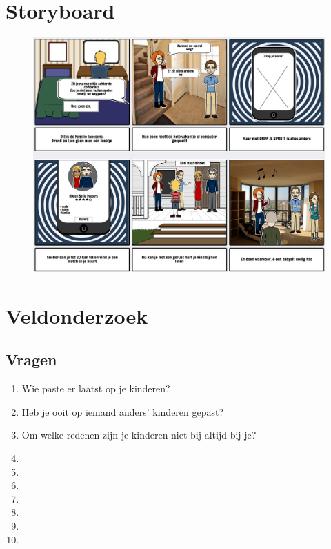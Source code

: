 \documentclass[a4paper,12pt]{article}
\begin{document}
\section{Storyboard}

\begin{figure}[H]
  \centering
  \includegraphics[width=\textwidth,keepaspectratio]{./storyboard.png}
\end{figure}

\section{Veldonderzoek}

\subsection{Vragen}
\begin{enumerate}
  \item Wie paste er laatst op je kinderen?
  \item Heb je ooit op iemand anders' kinderen gepast?
  \item Om welke redenen zijn je kinderen niet bij altijd bij je?
  \item
  \item
  \item
  \item
  \item
  \item
  \item
\end{enumerate}
\end{document}
